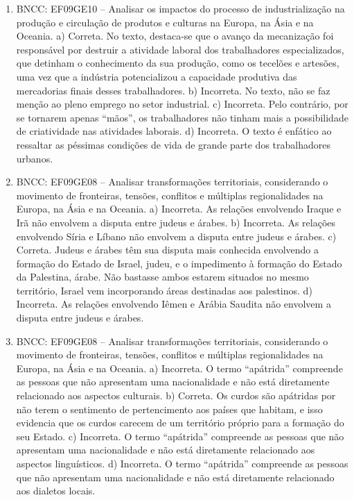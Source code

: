 \begin{enumerate}
\item
BNCC: EF09GE10 -- Analisar os impactos do processo de industrialização na
produção e circulação de produtos e culturas na Europa, na Ásia e na
Oceania.
a) Correta. No texto, destaca-se que o avanço da mecanização foi
responsável por destruir a atividade laboral dos trabalhadores
especializados, que detinham o conhecimento da sua produção, como os
tecelões e artesões, uma vez que a indústria potencializou a capacidade
produtiva das mercadorias finais desses trabalhadores.
b) Incorreta. No texto, não se faz menção ao pleno emprego no setor
industrial.
c) Incorreta. Pelo contrário, por se tornarem apenas ``mãos'', os
trabalhadores não tinham mais a possibilidade de criatividade nas
atividades laborais.
d) Incorreta. O texto é enfático ao ressaltar as péssimas condições de
vida de grande parte dos trabalhadores urbanos.

\item
BNCC: EF09GE08 -- Analisar transformações territoriais, considerando o
movimento de fronteiras, tensões, conflitos e múltiplas regionalidades
na Europa, na Ásia e na Oceania.
a) Incorreta. As relações envolvendo Iraque e Irã não envolvem a
disputa entre judeus e árabes.
b) Incorreta. As relações envolvendo Síria e Líbano não envolvem a
disputa entre judeus e árabes.
c) Correta. Judeus e árabes têm sua disputa mais conhecida envolvendo
a formação do Estado de Israel, judeu, e o impedimento à formação do
Estado da Palestina, árabe. Não bastasse ambos estarem situados no mesmo
território, Israel vem incorporando áreas destinadas aos
palestinos.
d) Incorreta. As relações envolvendo Iêmen e Arábia Saudita não
envolvem a disputa entre judeus e árabes.

\item
BNCC: EF09GE08 -- Analisar transformações territoriais, considerando o
movimento de fronteiras, tensões, conflitos e múltiplas regionalidades
na Europa, na Ásia e na Oceania.
a)  Incorreta. O termo ``apátrida'' compreende as pessoas que não apresentam uma nacionalidade e não está diretamente relacionado aos aspectos culturais.
b)  Correta. Os curdos são apátridas por não terem o sentimento de pertencimento aos países que habitam, e isso evidencia que os curdos carecem de um território próprio para a formação do seu Estado.
c)  Incorreta. O termo ``apátrida'' compreende as pessoas que não apresentam uma nacionalidade e não está diretamente relacionado aos aspectos linguísticos.
d)  Incorreta. O termo ``apátrida'' compreende as pessoas que não apresentam uma nacionalidade e não está diretamente relacionado aos dialetos locais.
\end{enumerate}

